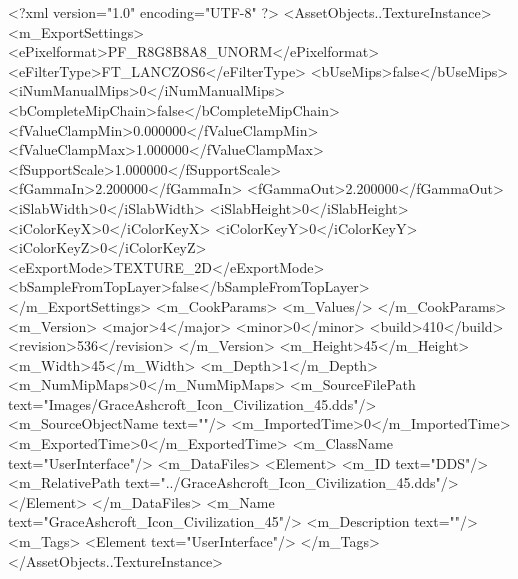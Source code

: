 <?xml version="1.0" encoding="UTF-8" ?>
<AssetObjects..TextureInstance>
	<m_ExportSettings>
		<ePixelformat>PF_R8G8B8A8_UNORM</ePixelformat>
		<eFilterType>FT_LANCZOS6</eFilterType>
		<bUseMips>false</bUseMips>
		<iNumManualMips>0</iNumManualMips>
		<bCompleteMipChain>false</bCompleteMipChain>
		<fValueClampMin>0.000000</fValueClampMin>
		<fValueClampMax>1.000000</fValueClampMax>
		<fSupportScale>1.000000</fSupportScale>
		<fGammaIn>2.200000</fGammaIn>
		<fGammaOut>2.200000</fGammaOut>
		<iSlabWidth>0</iSlabWidth>
		<iSlabHeight>0</iSlabHeight>
		<iColorKeyX>0</iColorKeyX>
		<iColorKeyY>0</iColorKeyY>
		<iColorKeyZ>0</iColorKeyZ>
		<eExportMode>TEXTURE_2D</eExportMode>
		<bSampleFromTopLayer>false</bSampleFromTopLayer>
	</m_ExportSettings>
	<m_CookParams>
		<m_Values/>
	</m_CookParams>
	<m_Version>
		<major>4</major>
		<minor>0</minor>
		<build>410</build>
		<revision>536</revision>
	</m_Version>
	<m_Height>45</m_Height>
	<m_Width>45</m_Width>
	<m_Depth>1</m_Depth>
	<m_NumMipMaps>0</m_NumMipMaps>
	<m_SourceFilePath text="Images/GraceAshcroft_Icon_Civilization_45.dds"/>
	<m_SourceObjectName text=""/>
	<m_ImportedTime>0</m_ImportedTime>
	<m_ExportedTime>0</m_ExportedTime>
	<m_ClassName text="UserInterface"/>
	<m_DataFiles>
		<Element>
			<m_ID text="DDS"/>
			<m_RelativePath text="../GraceAshcroft_Icon_Civilization_45.dds"/>
		</Element>
	</m_DataFiles>
	<m_Name text="GraceAshcroft_Icon_Civilization_45"/>
	<m_Description text=""/>
	<m_Tags>
		<Element text="UserInterface"/>
	</m_Tags>
</AssetObjects..TextureInstance>
